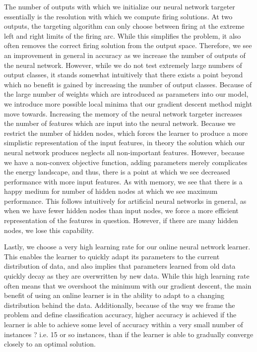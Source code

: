 \documentclass[11pt,letterpaper]{article}
\begin{document}
The number of outputs with which we initialize our neural network targeter essentially is the resolution with which we compute firing solutions. At two outputs, the targeting algorithm can only choose between firing at the extreme left and right limits of the firing arc. While this simplifies the problem, it also often removes the correct firing solution from the output space. Therefore, we see an improvement in general in accuracy as we increase the number of outputs of the neural network. However, while we do not test extremely large numbers of output classes, it stands somewhat intuitively that there exists a point beyond which no benefit is gained by increasing the number of output classes. Because of the large number of weights which are introduced as parameters into our model, we introduce more possible local minima that our gradient descent method might move towards.
Increasing the memory of the neural network targeter increases the number of features which are input into the neural network. Because we restrict the number of hidden nodes, which forces the learner to produce a more simplistic representation of the input features, in theory the solution which our neural network produces neglects all non-important features. However, because we have a non-convex objective function, adding parameters merely complicates the energy landscape, and thus, there is a point at which we see decreased performance with more input features.
As with memory, we see that there is a happy medium for number of hidden nodes at which we see maximum performance. This follows intuitively for artificial neural networks in general, as when we have fewer hidden nodes than input nodes, we force a more efficient representation of the features in question. However, if there are many hidden nodes, we lose this capability.

Lastly, we choose a very high learning rate for our online neural network learner. This enables the learner to quickly adapt its parameters to the current distribution of data, and also implies that parameters learned from old data quickly decay as they are overwritten by new data. While this high learning rate often means that we overshoot the minimum with our gradient descent, the main benefit of using an online learner is in the ability to adapt to a changing distribution behind the data. Additionally, because of the way we frame the problem and define classification accuracy, higher accuracy is achieved if the learner is able to achieve some level of accuracy within a very small number of instances ? i.e. 15 or so instances, than if the learner is able to gradually converge closely to an optimal solution.
\end{document}
